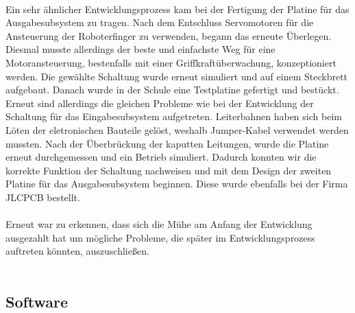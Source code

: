 \documentclass[titlepage,12pt,twoside]{article}
\begin{document}
\\
Ein sehr ähnlicher Entwicklungsprozess kam bei der Fertigung der Platine für das Ausgabesubsystem zu tragen. Nach dem Entschluss Servomotoren für die Ansteuerung der Roboterfinger zu verwenden, begann das erneute Überlegen. Diesmal
musste allerdings der beste und einfachste Weg für eine Motoransteuerung, bestenfalls mit einer Griffkraftüberwachung, konzeptioniert werden. Die gewählte Schaltung wurde erneut simuliert und auf einem Steckbrett aufgebaut. 
Danach wurde in der Schule eine Testplatine gefertigt und bestückt. Erneut sind allerdings die gleichen Probleme wie bei der Entwicklung der Schaltung für das Eingabesubsystem aufgetreten. Leiterbahnen haben sich beim Löten der 
eletronischen Bauteile gelöst, weshalb Jumper-Kabel verwendet werden mussten. Nach der Überbrückung der kaputten Leitungen, wurde die Platine erneut durchgemessen und ein Betrieb simuliert. Dadurch konnten wir die korrekte Funktion der 
Schaltung nachweisen und mit dem Design der zweiten Platine für das Ausgabesubsystem beginnen. Diese wurde ebenfalls bei der Firma JLCPCB bestellt. \\
\\
Erneut war zu erkennen, dass sich die Mühe am Anfang der Entwicklung ausgezahlt hat um mögliche Probleme, die später im Entwicklungsprozess auftreten könnten, auszuschließen. \\
\\

\subsection{Software}
\end{document}

